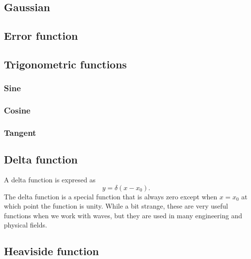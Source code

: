 \documentclass[final,a4paper,12pt]{article}
\theoremstyle{definition}
\begin{document}
\subsection{Gaussian}
\vspace{16ex}

\subsection{Error function}
\vspace{16ex}

\subsection{Trigonometric functions}
\subsubsection{Sine}
\vspace{16ex}
\subsubsection{Cosine}
\vspace{16ex}
\subsubsection{Tangent}
\vspace{16ex}

\subsection{Delta function}
A delta function is expresed as
\begin{equation}
    y = \delta (x - x_0).
\end{equation}
The delta function is a special function that is always zero except when $x =
x_0$ at which point the function is unity.  While a bit strange, these are very
useful functions when we work with waves, but they are used in many engineering
and physical fields.

\subsection{Heaviside function}
\vspace{16ex}
\end{document}
